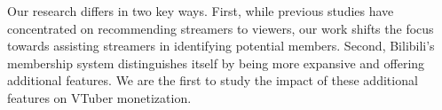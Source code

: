 Our research differs in two key ways. First, while previous studies have concentrated on recommending streamers to viewers, our work shifts the focus towards assisting streamers in identifying potential members. Second, Bilibili's membership system distinguishes itself by being more expansive and offering additional features. We are the first to study the impact of these additional features on VTuber monetization.





